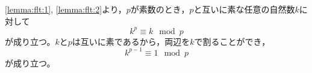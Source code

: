 \documentclass{article}
\makeatletter
\renewenvironment{proof}[1][\proofname]{\par
    \pushQED{\qed}
    \normalfont
    \topsep6\p@\@plus6\p@ \trivlist
    \item[\hskip\labelsep{\bfseries #1}\@addpunct{\bfseries}]\ignorespaces
}{%
    \popQED\endtrivlist\@endpefalse
}
\renewcommand{\proofname}{証明.}
\makeatother
\begin{document}
\begin{proof}
    \cref{lemma:flt:1}, \cref{lemma:flt:2}より，$p$が素数のとき，$p$と互いに素な任意の自然数$k$に対して
    \begin{equation*}
        k^p \equiv k \mod{p}
    \end{equation*}
    が成り立つ。$k$と$p$は互いに素であるから，両辺を$k$で割ることができ，
    \begin{equation*}
        k^{p - 1} \equiv 1 \mod{p}
    \end{equation*}
    が成り立つ。
\end{proof}
\end{document}
